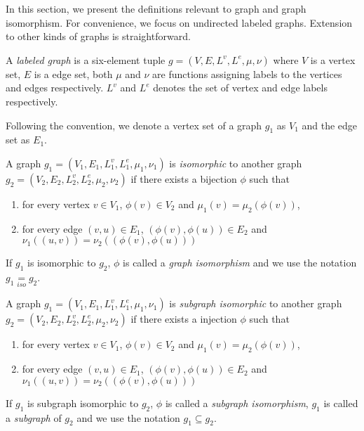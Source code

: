 In this section, we present the definitions relevant to graph and graph isomorphism. For convenience, we focus on undirected labeled graphs. 
Extension to other kinds of graphs is straightforward.

\begin{definition}
\label{def:def31}
A \textit{labeled graph} is a six-element tuple $g= (V,E,L^v ,L^e ,\mu,\nu)$ where $V$ is a vertex set, $E$ is a edge set, both $\mu$ and $\nu$ 
are functions assigning labels to the vertices and edges respectively. $L^v$ and $L^e$ denotes the set of vertex and edge labels respectively.
\end{definition}

Following the convention, we denote a vertex set of a graph $g_1$ as $V_1$ and the edge set as $E_1$.

\begin{definition}
\label{def:def32}
A graph $g_1=(V_1,E_1,L_1^v ,L_1^e ,\mu_1,\nu_1)$ is \textit{isomorphic} to another graph $g_2=(V_2,E_2,L_2^v ,L_2^e , \mu_2, \nu_2)$ if there exists a bijection $\phi$ such that
\begin{enumerate}
\item for every vertex $v \in V_1$, $\phi(v) \in V_2$ and $\mu_1(v) = \mu_2(\phi(v))$,
\item for every edge $(v,u) \in E_1$, $(\phi(v), \phi(u)) \in E_2$ and $\nu_1((u,v)) = \nu_2((\phi(v), \phi(u)))$
\end{enumerate}
\end{definition}

If $g_1$ is isomorphic to $g_2$, $\phi$ is called a \textit{graph isomorphism} and we use the notation $ g_1 \underset{iso}{=}  g_2$.

\begin{definition}
\label{def:def33}
A graph $g_1=(V_1,E_1,L_1^v ,L_1^e ,\mu_1,\nu_1)$  is \textit{subgraph isomorphic} to another graph $g_2=(V_2,E_2,L_2^v ,L_2^e , \mu_2, \nu_2)$ if there exists a injection $\phi$ such that
\begin{enumerate}
\item for every vertex $v \in V_1$, $\phi(v) \in V_2$ and $\mu_1(v) = \mu_2(\phi(v))$,
\item for every edge $(v,u) \in E_1$, $(\phi(v), \phi(u)) \in E_2$ and $\nu_1((u,v)) = \nu_2((\phi(v), \phi(u)))$
\end{enumerate}
\end{definition}

If $g_1$ is subgraph isomorphic to $g_2$, $\phi$ is called a \textit{subgraph isomorphism},
$g_1$ is called a \textit{subgraph} of $g_2$ and we use the notation $g_1 \subseteq g_2$.

